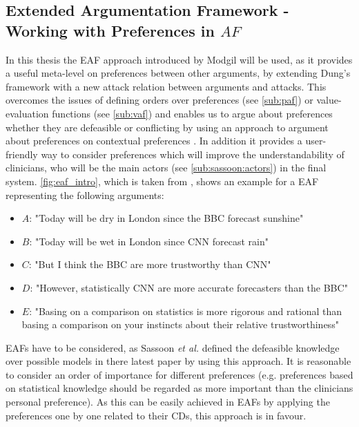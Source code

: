 \subsection{Extended Argumentation Framework - Working with Preferences in $AF$}
\label{sub:eaf}



In this thesis the \gls{EAF} approach introduced by Modgil \cite{Modgil2009} will be used, as it provides a useful meta-level on preferences between other arguments, by extending Dung's framework with a new attack relation between arguments and attacks. This overcomes the issues of defining orders over preferences (see \autoref{sub:paf}) or value-evaluation functions (see \autoref{sub:vaf}) and enables us to argue about preferences whether they are defeasible or conflicting by using an approach to argument about preferences on contextual preferences \cite{amgoud2000}. In addition it provides a user-friendly way to consider preferences which will improve the understandability of clinicians, who will be the main actors (see \autoref{sub:sassoon:actors}) in the final system.
\autoref{fig:eaf_intro}, which is taken from \cite{Modgil2009}, shows an example for a \gls{EAF} representing the following arguments:

\begin{itemize}
	\item $A$: "Today will be dry in London since the BBC forecast sunshine"
	\item $B$: "Today will be wet in London since CNN forecast rain"
	\item $C$: "But I think the BBC are more trustworthy than CNN"
	\item $D$: "However, statistically CNN are more accurate forecasters than the BBC"
	\item $E$: "Basing on a comparison on statistics is more rigorous and rational than basing a comparison on your instincts about their relative trustworthiness"
\end{itemize}

\bigskip

\Glspl{EAF} have to be considered, as Sassoon \textit{et al.} defined the defeasible knowledge over possible models in there latest paper \cite{sassoon2016CD} by using this approach. It is reasonable to consider an order of importance for different preferences (e.g. preferences based on statistical knowledge should be regarded as more important than the clinicians personal preference). As this can be easily achieved in \glspl{EAF} by applying the preferences one by one related to their \glspl{CD}, this approach is in favour.

